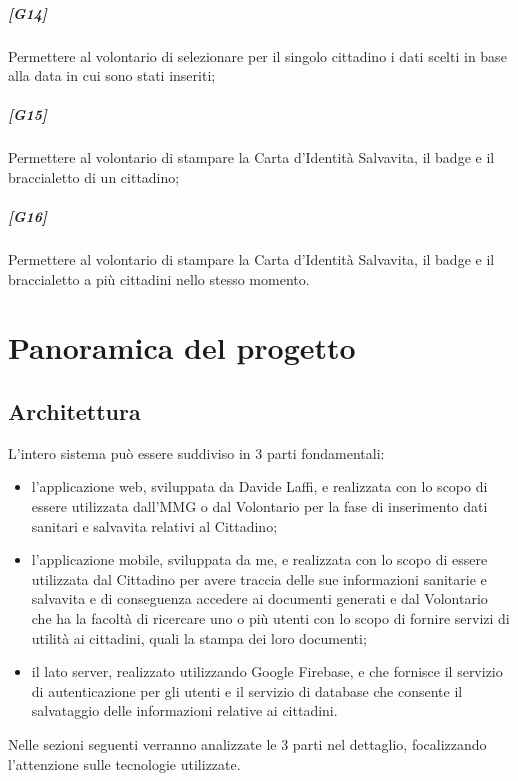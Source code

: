 \documentclass[12pt,a4paper,twoside,openright,titlepage]{book}
\begin{document}
\paragraph{[G14]} Permettere al volontario di selezionare per il singolo cittadino i dati scelti in base alla data in cui sono stati inseriti;
\paragraph{[G15]} Permettere al volontario di stampare la Carta d'Identità Salvavita, il badge e il braccialetto di un cittadino;
\paragraph{[G16]} Permettere al volontario di stampare la Carta d'Identità Salvavita, il badge e il braccialetto a più cittadini nello stesso momento.


\chapter{Panoramica del progetto}

\section{Architettura}
L'intero sistema può essere suddiviso in 3 parti fondamentali:
\begin{itemize}
\item l'applicazione web, sviluppata da Davide Laffi, e realizzata con lo scopo di essere utilizzata dall'MMG o dal Volontario per la fase di inserimento dati sanitari e salvavita relativi al Cittadino;
\item l'applicazione mobile, sviluppata da me, e realizzata con lo scopo di essere utilizzata dal Cittadino per avere traccia delle sue informazioni sanitarie e salvavita e di conseguenza accedere ai documenti generati e dal Volontario che ha la facoltà di ricercare uno o più utenti con lo scopo di fornire servizi di utilità ai cittadini, quali la stampa dei loro documenti;
\item il lato server, realizzato utilizzando Google Firebase, e che fornisce il servizio di autenticazione per gli utenti e il servizio di database che consente il salvataggio delle informazioni relative ai cittadini.
\end{itemize}
Nelle sezioni seguenti verranno analizzate le 3 parti nel dettaglio, focalizzando l'attenzione sulle tecnologie utilizzate.\newline
\end{document}
